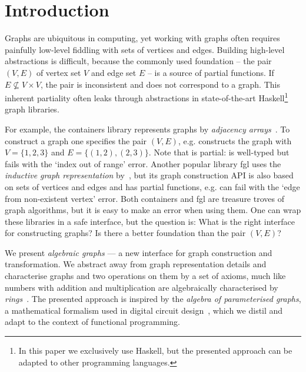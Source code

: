 \section{Introduction}\label{sec-intro}

Graphs are ubiquitous in computing, yet working with graphs often requires
painfully low-level fiddling with sets of vertices and edges. Building
high-level abstractions is difficult, because the commonly used
foundation -- the pair $(V, E)$ of vertex set $V$ and edge set $E$ -- is a source
of partial functions. If $E \nsubseteq V \times V$, the pair is inconsistent and
does not correspond to a graph. This inherent partiality often leaks through
abstractions in state-of-the-art Haskell\footnote{In this paper
we exclusively use Haskell, but the presented approach can be adapted to other
programming languages.} graph libraries.

For example, the \textsf{containers} library represents graphs by
\emph{adjacency arrays}~\cite{1995_king_graphs}. To construct a graph
one specifies the pair $(V,E)$, e.g.
 constructs the graph with $V=\{1,2,3\}$ and
$E=\{(1,2), (2,3)\}$. Note that  is partial:
 is well-typed but fails with the
\textsf{`index out of range'} error. Another popular library \textsf{fgl}
uses the \emph{inductive graph representation} by~\citet{2001_erwig_inductive},
but its graph construction API is also based on sets of vertices and edges and
has partial functions, e.g.  can fail with
the \textsf{`edge from non-existent vertex'} error. Both \textsf{containers}
and \textsf{fgl} are treasure troves of graph algorithms, but it is easy to make an
error when using them. One can wrap these libraries in a safe interface, but the
question is: What is the right interface for constructing graphs? Is there a better
foundation than the pair $(V, E)$?

We present \emph{algebraic graphs} --- a new interface
for graph construction and transformation. We abstract away from graph representation
details and characterise graphs and two operations on them by a set of axioms,
much like numbers with addition and multiplication are algebraically characterised
by \emph{rings}~\cite{1999_maclane_algebra}. The presented approach is inspired by the
\emph{algebra of parameterised graphs}, a mathematical formalism used in digital
circuit design~\cite{2014_algebra_mokhov}, which we distil and adapt to the context
of functional programming.


